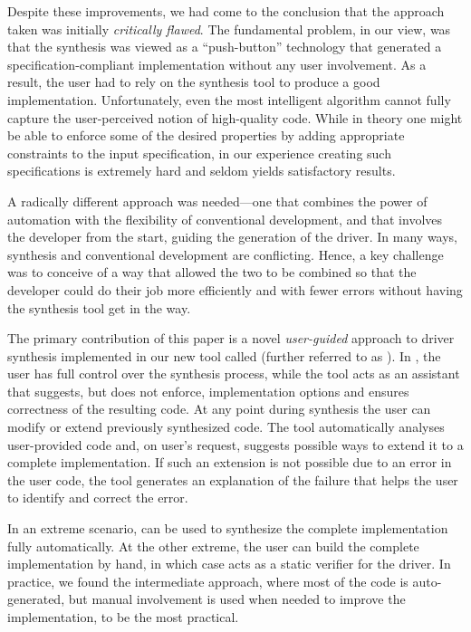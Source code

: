 Despite these improvements, we had come to the conclusion that the approach taken was initially \emph{critically flawed}.  The fundamental problem, in our view, was that the synthesis was viewed as a ``push-button'' technology that generated a specification-compliant implementation without any user involvement.  As a result, the user had to rely on the synthesis tool to produce a good implementation.  Unfortunately, even the most intelligent algorithm cannot fully capture the user-perceived notion of high-quality code.  While in theory one might be able to enforce some of the desired properties by adding appropriate constraints to the input specification, in our experience creating such specifications is extremely hard and seldom yields satisfactory results.

A radically different approach was needed---one that combines the power of automation with the flexibility of conventional development, and that involves the developer from the start, guiding the generation of the driver.  In many ways, synthesis and conventional development are conflicting.  Hence, a key challenge was to conceive of a way that allowed the two to be combined so that the developer could do their job more efficiently and with fewer errors without having the synthesis tool get in the way.

The primary contribution of this paper is a novel \emph{user-guided} approach to driver synthesis implemented in our new tool called  (further referred to as \termite).  In \termite, the user has full control over the synthesis process, while the tool acts as an assistant that suggests, but does not enforce, implementation options and ensures correctness of the resulting code.  At any point during synthesis the user can modify or extend previously synthesized code.  The tool automatically analyses user-provided code and, on user's request, suggests possible ways to extend it to a complete implementation.  If such an extension is not possible due to an error in the user code, the tool generates an explanation of the failure that helps the user to identify and correct the error.

In an extreme scenario, \termite can be used to synthesize the complete implementation fully automatically.  At the other extreme, the user can build the complete implementation by hand, in which case \termite acts as a static verifier for the driver.  In practice, we found the intermediate approach, where most of the code is auto-generated, but manual involvement is used when needed to improve the implementation, to be the most practical.

